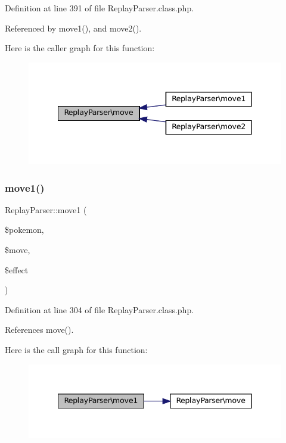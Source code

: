 Definition at line 391 of file Replay\+Parser.\+class.\+php.



Referenced by move1(), and move2().

Here is the caller graph for this function\+:\nopagebreak
\begin{figure}[H]
\begin{center}
\leavevmode
\includegraphics[width=342pt]{class_replay_parser_af8789f1b8220b77c6054efba8fa84c7a_icgraph}
\end{center}
\end{figure}
\mbox{\label{class_replay_parser_a82f21a21c1885dd9fc471ef5f97fab5e}} 
\subsubsection{\texorpdfstring{move1()}{move1()}}
{\footnotesize\ttfamily Replay\+Parser\+::move1 (\begin{DoxyParamCaption}\item[{}]{\$pokemon,  }\item[{}]{\$move,  }\item[{}]{\$effect }\end{DoxyParamCaption})}



Definition at line 304 of file Replay\+Parser.\+class.\+php.



References move().

Here is the call graph for this function\+:\nopagebreak
\begin{figure}[H]
\begin{center}
\leavevmode
\includegraphics[width=342pt]{class_replay_parser_a82f21a21c1885dd9fc471ef5f97fab5e_cgraph}
\end{center}
\end{figure}
\mbox{\label{class_replay_parser_a85c7106777dea6a2770e60ba29b7d467}} 

